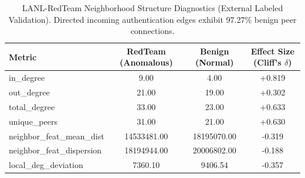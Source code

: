 \begin{table}[h]
\centering
\caption{LANL-RedTeam Neighborhood Structure Diagnostics (External Labeled Validation). Directed incoming authentication edges exhibit 97.27\% benign peer connections.}
\label{tab:lanl_diagnostics_summary}
\small
\begin{tabular}{l c c c}
\toprule
\textbf{Metric} & \textbf{RedTeam (Anomalous)} & \textbf{Benign (Normal)} & \textbf{Effect Size (Cliff's $\delta$)} \\
\midrule
in_degree & 9.00 & 4.00 & +0.819 \\
out_degree & 21.00 & 19.00 & +0.302 \\
total_degree & 33.00 & 23.00 & +0.633 \\
unique_peers & 31.00 & 21.00 & +0.630 \\
neighbor_feat_mean_dist & 14533481.00 & 18195070.00 & -0.319 \\
neighbor_feat_dispersion & 18194944.00 & 20006802.00 & -0.188 \\
local_deg_deviation & 7360.10 & 9406.54 & -0.357 \\
\bottomrule
\end{tabular}
\end{table}
